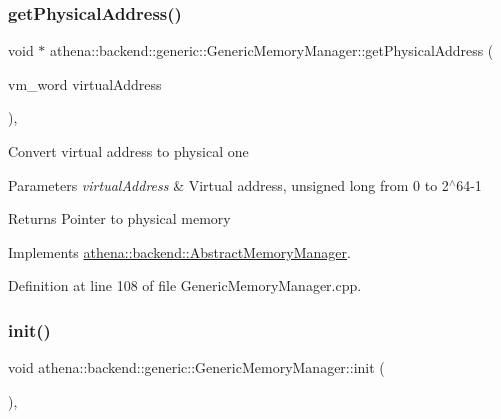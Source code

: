 \subsubsection{\texorpdfstring{get\+Physical\+Address()}{getPhysicalAddress()}}
{\footnotesize\ttfamily void $\ast$ athena\+::backend\+::generic\+::\+Generic\+Memory\+Manager\+::get\+Physical\+Address (\begin{DoxyParamCaption}\item[{vm\+\_\+word}]{virtual\+Address }\end{DoxyParamCaption})\hspace{0.3cm}{\ttfamily [override]}, {\ttfamily [virtual]}}

Convert virtual address to physical one 
\begin{DoxyParams}{Parameters}
{\em virtual\+Address} & Virtual address, unsigned long from 0 to 2$^\wedge$64-\/1 \\
\hline
\end{DoxyParams}
\begin{DoxyReturn}{Returns}
Pointer to physical memory 
\end{DoxyReturn}


Implements \mbox{\hyperlink{classathena_1_1backend_1_1_abstract_memory_manager_ad441d7a2281f5f2b2627272d136f72b8}{athena\+::backend\+::\+Abstract\+Memory\+Manager}}.



Definition at line 108 of file Generic\+Memory\+Manager.\+cpp.

\mbox{\label{classathena_1_1backend_1_1generic_1_1_generic_memory_manager_a0e39c872b8b41d5239884322988d314d}} 
\subsubsection{\texorpdfstring{init()}{init()}}
{\footnotesize\ttfamily void athena\+::backend\+::generic\+::\+Generic\+Memory\+Manager\+::init (\begin{DoxyParamCaption}{ }\end{DoxyParamCaption})\hspace{0.3cm}{\ttfamily [override]}, {\ttfamily [virtual]}}

